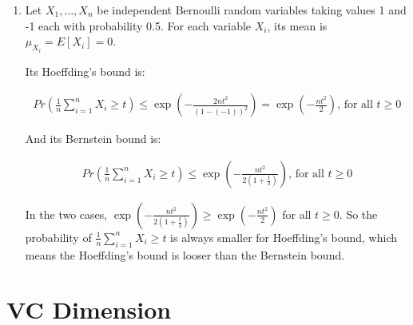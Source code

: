 \documentclass[paper=letter, fontsize=12pt]{article}
\begin{document}
\begin{enumerate}[label=(\alph*)]
	\item Let $X_1, \dots, X_n$ be independent Bernoulli random variables taking values 1 and -1 each with probability 0.5. For each variable $X_i$, its mean is $\mu_{X_i} = E[X_i] = 0$.
	
	Its Hoeffding's bound is:
	
	\begin{align*}
	Pr(\frac{1}{n} \sum_{i = 1}^{n} X_i \geq t) \leq \exp (- \frac{2nt^2}{(1 - (-1))^2}) = \exp (- \frac{nt^2}{2}) \text{, for all } t \geq 0
	\end{align*}
	
	And its Bernstein bound is:
	
	\begin{align*}
	Pr(\frac{1}{n} \sum_{i = 1}^{n} X_i \geq t) \leq \exp (- \frac{nt^2}{2(1 + \frac{t}{3})}) \text{, for all } t \geq 0
	\end{align*}
	
	In the two cases, $\exp (- \frac{nt^2}{2(1 + \frac{t}{3})}) \geq  \exp (- \frac{nt^2}{2})$ for all $t \geq 0$. So the probability of $\frac{1}{n} \sum_{i = 1}^{n} X_i \geq t$ is always smaller for Hoeffding's bound, which means the Hoeffding's bound is looser than the Bernstein bound. 

\end{enumerate}

\section{VC Dimension}
\end{document}
